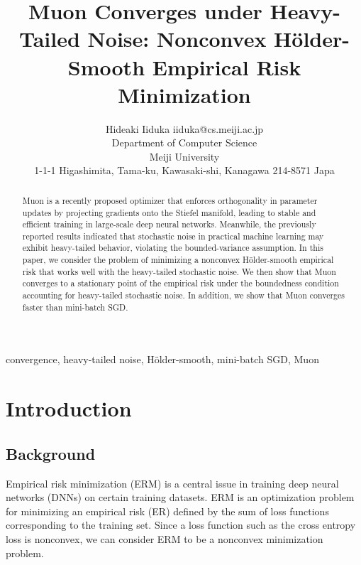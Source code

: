 \documentclass[twoside,11pt]{article}
\begin{document}
\title{Muon Converges under Heavy-Tailed Noise: Nonconvex H\"{o}lder-Smooth Empirical Risk Minimization}

\author{\name Hideaki Iiduka \email iiduka@cs.meiji.ac.jp \\
       \addr Department of Computer Science\\
       Meiji University\\
       1-1-1 Higashimita, Tama-ku, Kawasaki-shi, Kanagawa 214-8571 Japa
       }

\editor{}

\maketitle

\begin{abstract}%
Muon is a recently proposed optimizer that enforces orthogonality in parameter updates by projecting gradients onto the Stiefel manifold, leading to stable and efficient training in large-scale deep neural networks. Meanwhile, the previously reported results indicated that stochastic noise in practical machine learning may exhibit heavy-tailed behavior, violating the bounded-variance assumption. In this paper, we consider the problem of minimizing a nonconvex H\"{o}lder-smooth empirical risk that works well with the heavy-tailed stochastic noise. We then show that Muon converges to a stationary point of the empirical risk under the boundedness condition accounting for heavy-tailed stochastic noise. In addition, we show that Muon converges faster than mini-batch SGD. 
\end{abstract}

\begin{keywords}
convergence, heavy-tailed noise, H\"{o}lder-smooth, mini-batch SGD, Muon
\end{keywords}

\section{Introduction}
\subsection{Background}
Empirical risk minimization (ERM) is a central issue in training deep neural networks (DNNs) on certain training datasets. ERM is an optimization problem for minimizing an empirical risk (ER) defined by the sum of loss functions corresponding to the training set. Since a loss function such as the cross entropy loss is nonconvex, we can consider ERM to be a nonconvex minimization problem. 
\end{document}
